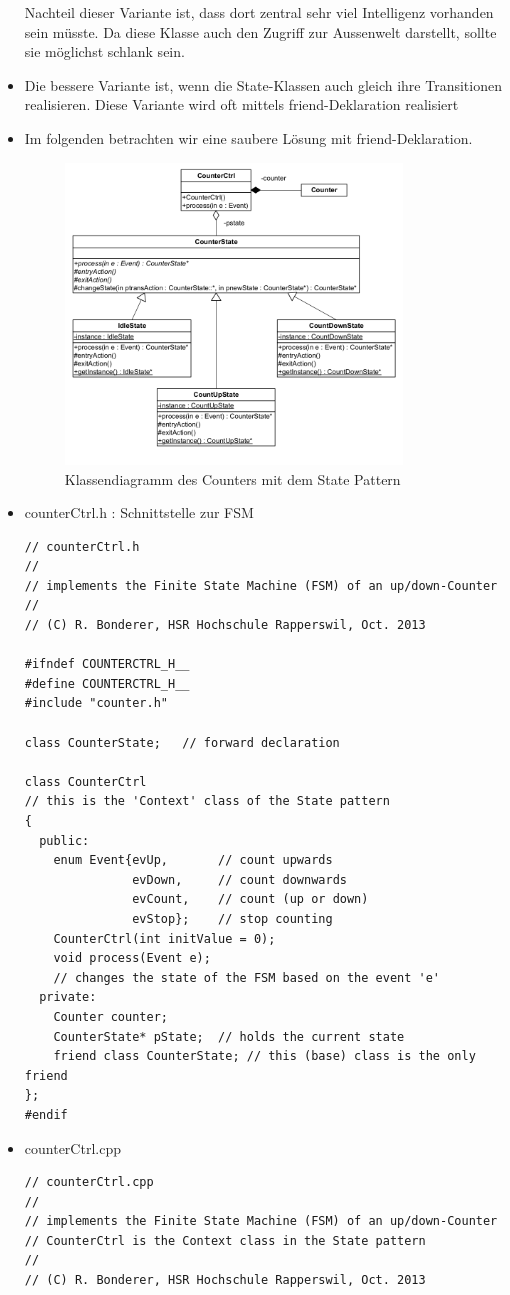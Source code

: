 \begin{itemize}
Nachteil dieser Variante ist, dass dort zentral sehr viel Intelligenz vorhanden
sein müsste. Da diese Klasse auch den Zugriff zur Aussenwelt darstellt, sollte
sie möglichst schlank sein.
\item Die bessere Variante ist, wenn die State-Klassen auch gleich ihre
Transitionen realisieren. Diese Variante wird oft mittels friend-Deklaration
realisiert
\item Im folgenden betrachten wir eine saubere Lösung mit friend-Deklaration.
 \begin{figure}[h]
  \centering
  {\includegraphics[height=8cm]{images/FSM/klassendiagramm}  
  \caption{Klassendiagramm des Counters mit dem State Pattern}
  \label{fig:klassendiagramm}}
\end{figure}
\item counterCtrl.h : Schnittstelle zur FSM
	\begin{lstlisting}[style=Cpp]
// counterCtrl.h
//
// implements the Finite State Machine (FSM) of an up/down-Counter
//
// (C) R. Bonderer, HSR Hochschule Rapperswil, Oct. 2013

#ifndef COUNTERCTRL_H__
#define COUNTERCTRL_H__
#include "counter.h"

class CounterState;   // forward declaration

class CounterCtrl
// this is the 'Context' class of the State pattern
{
  public:
    enum Event{evUp,       // count upwards
               evDown,     // count downwards
               evCount,    // count (up or down)
               evStop};    // stop counting
    CounterCtrl(int initValue = 0);
    void process(Event e);  
    // changes the state of the FSM based on the event 'e'
  private:
    Counter counter;
    CounterState* pState;  // holds the current state
    friend class CounterState; // this (base) class is the only friend
};
#endif
\end{lstlisting}
\item counterCtrl.cpp
	\begin{lstlisting}[style=Cpp]
// counterCtrl.cpp
//
// implements the Finite State Machine (FSM) of an up/down-Counter
// CounterCtrl is the Context class in the State pattern
//
// (C) R. Bonderer, HSR Hochschule Rapperswil, Oct. 2013


\end{lstlisting}
\end{itemize}
